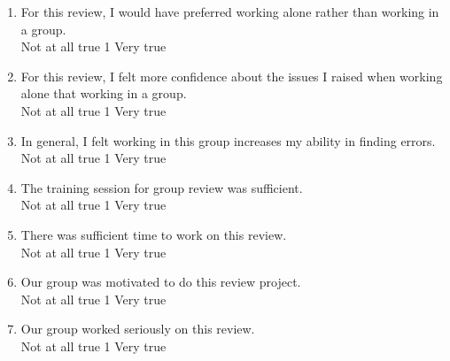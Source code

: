 \begin {enumerate}
\item For this review, I would have preferred working alone rather
than working in a group.
\\
Not at all true \hfill 1     \hfill Very true\\

\item For this review, I felt more confidence about the issues I raised when
working alone that working in a group.
\\
Not at all true \hfill 1     \hfill Very true\\

\item  In general, I felt working in this group increases my ability
in finding errors. 
\\
Not at all true \hfill 1     \hfill Very true\\


\item The training session for group review was sufficient.
\\
Not at all true \hfill 1     \hfill Very true\\

\item There was sufficient time to work on this review.
\\
Not at all true \hfill 1     \hfill Very true\\

\item Our group was motivated to do this review project.
\\
Not at all true \hfill 1     \hfill Very true\\

\item Our group worked seriously on this review.
\\
Not at all true \hfill 1     \hfill Very true\\


\end{enumerate}
